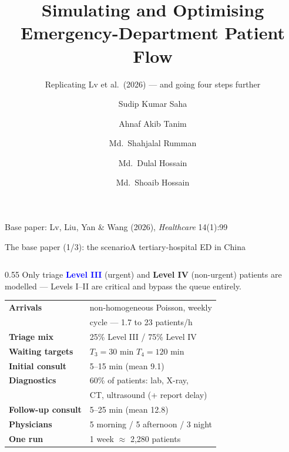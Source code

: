 \documentclass[aspectratio=169,11pt]{beamer}
\title{\textbf{Simulating and Optimising\\Emergency-Department Patient Flow}}
\subtitle{Replicating Lv et al.\ (2026) --- and going four steps further}
\author{Sudip Kumar Saha \and Ahnaf Akib Tanim \and Md.\ Shahjalal Rumman \and
        Md.\ Dulal Hossain \and Md.\ Shoaib Hossain}
\institute{CSE 402 --- Numerical Analysis, Simulation and Modeling Sessional\\
           Group 02, Section C}
\date{}
\begin{document}
{
\begin{frame}[plain]
  \maketitle
  \vspace{-1.2em}
  \begin{center}\small\color{soft}
  Base paper: Lv, Liu, Yan \& Wang (2026), \emph{Healthcare} 14(1):99
  \end{center}
\end{frame}}

\begin{frame}{The base paper \textnormal{(1/3)}: the scenario}{A tertiary-hospital ED in China}
\begin{columns}[T,onlytextwidth]
\begin{column}{0.55\textwidth}
\vspace{0.1em}
{\footnotesize Only triage \textcolor{blue}{\textbf{Level III}} (urgent) and
\textcolor{amber}{\textbf{Level IV}} (non-urgent) patients are modelled ---
Levels I--II are critical and bypass the queue entirely.}
\vspace{0.4em}

{\scriptsize
\begin{tabular}{@{}ll@{}}
\toprule
\textbf{Arrivals} & non-homogeneous Poisson, weekly \\
                  & cycle --- 1.7 to 23 patients/h \\
\textbf{Triage mix} & 25\% Level III / 75\% Level IV \\
\textbf{Waiting targets} & $T_3 = 30$ min \quad $T_4 = 120$ min \\
\textbf{Initial consult} & 5--15 min (mean 9.1) \\
\textbf{Diagnostics} & 60\% of patients: lab, X-ray, \\
                     & CT, ultrasound (+ report delay) \\
\textbf{Follow-up consult} & 5--25 min (mean 12.8) \\
\textbf{Physicians} & 5 morning / 5 afternoon / 3 night \\
\textbf{One run} & 1 week $\approx$ 2,280 patients \\
\bottomrule
\end{tabular}}
\vspace{0.4em}


\end{column}
\end{columns}
\end{frame}
\end{document}
